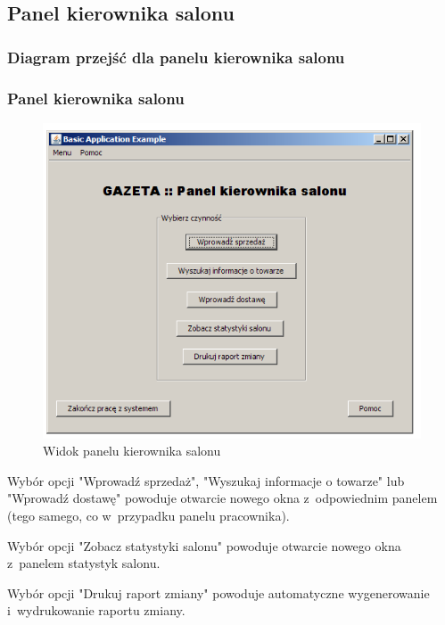\subsection{Panel kierownika salonu}
\subsubsection{Diagram przejść dla panelu kierownika salonu}
\subsubsection{Panel kierownika salonu}
\begin{figure}
\includegraphics[width=1\textwidth]{gfx/kierownik.png}
\caption{Widok panelu kierownika salonu}
\end{figure}
Wybór opcji "Wprowadź sprzedaż", "Wyszukaj informacje o towarze" lub "Wprowadź dostawę" powoduje otwarcie nowego okna z~odpowiednim panelem (tego samego, co w~przypadku panelu pracownika).

Wybór opcji "Zobacz statystyki salonu" powoduje otwarcie nowego okna z~panelem statystyk salonu.

Wybór opcji "Drukuj raport zmiany" powoduje automatyczne wygenerowanie i~wydrukowanie raportu zmiany.

